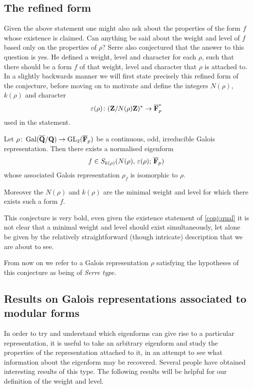 \documentclass[a4paper,12pt]{article}
\begin{document}
\subsection{The refined form}
Given the above statement one might also ask about the properties of the form $f$ whose existence is claimed.
Can anything be said about the weight and level of $f$ based only on the properties of $\rho$?
Serre also conjectured that the answer to this question is yes.
He defined a weight, level and character for each $\rho$, such that there should be a form $f$ of that weight, level and character that $\rho$ is attached to.
In a slightly backwards manner we will first state precisely this refined form of the conjecture, before moving on to motivate and define the integers $N(\rho)$, $k(\rho)$ and character
\[
\varepsilon(\rho)\colon (\mathbf{Z}/N(\rho)\mathbf{Z})^* \to \overline{\mathbf{F}}_p^*
\]
used in the statement.

\begin{conjecture}\label{conj:ref}
Let $\rho\colon \operatorname{Gal}(\overline{\mathbf{Q}}/\mathbf{Q}) \to \operatorname{GL}_2(\overline{\mathbf{F}}_p)$ be a continuous, odd, irreducible Galois representation.
Then there exists a normalised eigenform
\[
f\in S_{k(\rho)}(N(\rho),\,\varepsilon(\rho);\,\overline{\mathbf{F}}_p)
\]
whose associated Galois representation $\rho_f$ is isomorphic to $\rho$.

Moreover the $N(\rho)$ and $k(\rho)$ are the minimal weight and level for which there exists such a form $f$.
\end{conjecture}

This conjecture is very bold, even given the existence statement of \cref{conj:qual} it is not clear that a minimal weight and level should exist simultaneously, let alone be given by the relatively straightforward (though intricate) description that we are about to see.

From now on we refer to a Galois representation $\rho$ satisfying the hypotheses of this conjecture as being of \emph{Serre type}.


\subsection{Results on Galois representations associated to modular forms}\label{sec:galassoc}
In order to try and understand which eigenforms can give rise to a particular representation, it is useful to take an arbitrary eigenform and study the properties of the representation attached to it, in an attempt to see what information about the eigenform may be recovered.
Several people have obtained interesting results of this type.
The following results will be helpful for our definition of the weight and level.
\end{document}
